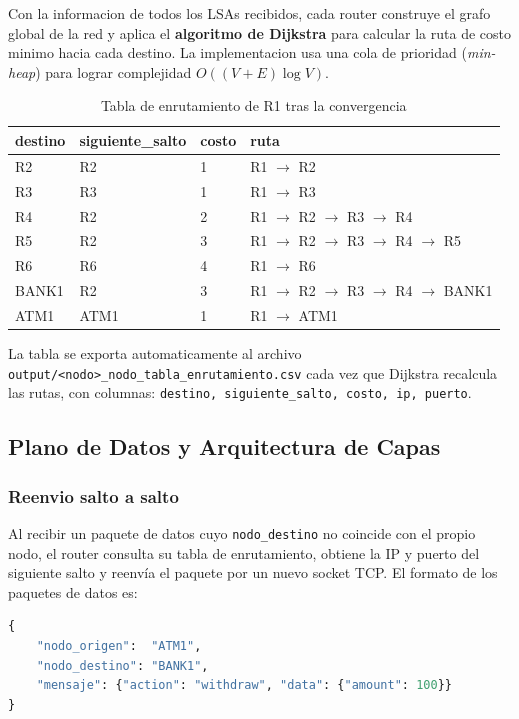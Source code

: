 ﻿\documentclass[12pt, a4paper]{article}
\begin{document}
Con la informacion de todos los LSAs recibidos, cada router construye el grafo
global de la red y aplica el \textbf{algoritmo de Dijkstra} para calcular la
ruta de costo minimo hacia cada destino. La implementacion usa una cola de
prioridad (\textit{min-heap}) para lograr complejidad $O((V + E) \log V)$.

\begin{table}[H]
    \centering
    \caption{Tabla de enrutamiento de R1 tras la convergencia}
    \begin{tabular}{llll}
        \toprule
        \textbf{destino} & \textbf{siguiente\_salto} & \textbf{costo} & \textbf{ruta} \\
        \midrule
        R2    & R2   & 1 & R1 $\to$ R2 \\
        R3    & R3   & 1 & R1 $\to$ R3 \\
        R4    & R2   & 2 & R1 $\to$ R2 $\to$ R3 $\to$ R4 \\
        R5    & R2   & 3 & R1 $\to$ R2 $\to$ R3 $\to$ R4 $\to$ R5 \\
        R6    & R6   & 4 & R1 $\to$ R6 \\
        BANK1 & R2   & 3 & R1 $\to$ R2 $\to$ R3 $\to$ R4 $\to$ BANK1 \\
        ATM1  & ATM1 & 1 & R1 $\to$ ATM1 \\
        \bottomrule
    \end{tabular}
\end{table}

La tabla se exporta automaticamente al archivo
\texttt{output/<nodo>\_nodo\_tabla\_enrutamiento.csv} cada vez que Dijkstra
recalcula las rutas, con columnas: \texttt{destino, siguiente\_salto, costo, ip, puerto}.

\subsection{Plano de Datos y Arquitectura de Capas}

\subsubsection{Reenvio salto a salto}

Al recibir un paquete de datos cuyo \texttt{nodo\_destino} no coincide con el
propio nodo, el router consulta su tabla de enrutamiento, obtiene la IP y
puerto del siguiente salto y reenvía el paquete por un nuevo socket TCP.
El formato de los paquetes de datos es:

\begin{lstlisting}[language=Python, caption=Paquete de datos]
{
    "nodo_origen":  "ATM1",
    "nodo_destino": "BANK1",
    "mensaje": {"action": "withdraw", "data": {"amount": 100}}
}
\end{lstlisting}
\end{document}
